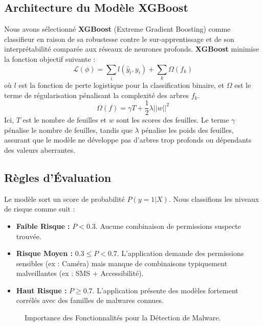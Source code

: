 \documentclass[
  journal=largetwo,
  manuscript=article-type,
  year=2025,
  volume=1,
]{cup-journal}
\begin{document}
\subsection{Architecture du Modèle XGBoost}
Nous avons sélectionné \textbf{XGBoost} (Extreme Gradient Boosting) comme classifieur en raison de sa robustesse contre le sur-apprentissage et de son interprétabilité comparée aux réseaux de neurones profonds. \textbf{XGBoost} minimise la fonction objectif suivante :
\begin{equation}
\mathcal{L}(\phi) = \sum_{i} l(\hat{y}_i, y_i) + \sum_{k} \Omega(f_k)
\end{equation}
où $l$ est la fonction de perte logistique pour la classification binaire, et $\Omega$ est le terme de régularisation pénalisant la complexité des arbres $f_k$.
\[
\Omega(f) = \gamma T + \frac{1}{2}\lambda ||w||^2
\]
Ici, $T$ est le nombre de feuilles et $w$ sont les scores des feuilles. Le terme $\gamma$ pénalise le nombre de feuilles, tandis que $\lambda$ pénalise les poids des feuilles, assurant que le modèle ne développe pas d'arbres trop profonds ou dépendants des valeurs aberrantes.

\subsection{Règles d'Évaluation}
Le modèle sort un score de probabilité $P(y=1|X)$. Nous classifions les niveaux de risque comme suit :
\begin{itemize}
    \item \textbf{Faible Risque :} $P < 0.3$. Aucune combinaison de permissions suspecte trouvée.
    \item \textbf{Risque Moyen :} $0.3 \le P < 0.7$. L'application demande des permissions sensibles (ex : Caméra) mais manque de combinaisons typiquement malveillantes (ex : SMS + Accessibilité).
    \item \textbf{Haut Risque :} $P \ge 0.7$. L'application présente des modèles fortement corrélés avec des familles de malwares connues.
\end{itemize}

\begin{figure}[hbt!]
\centering
{}
\caption{Importance des Fonctionnalités pour la Détection de Malware.}
\label{fig-ml}
\end{figure}
\end{document}
